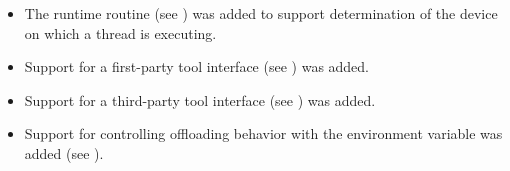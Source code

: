 \begin{itemize}
\item The  runtime routine
      (see ) was added to support
      determination of the device on which a thread is executing.

\item Support for a first-party tool interface (see
      ) was added.

\item Support for a third-party tool interface (see
      ) was added.

\item Support for controlling offloading behavior with the
       environment variable was added
      (see  ).

\end{itemize}


